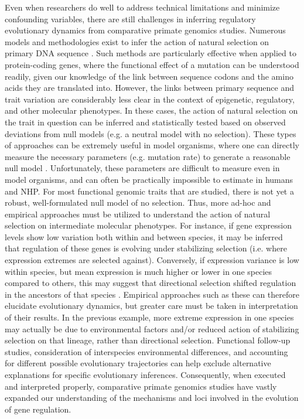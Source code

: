 Even when researchers do well to address technical limitations and minimize confounding variables, there are still challenges in inferring regulatory evolutionary dynamics from comparative primate genomics studies. Numerous models and methodologies exist to infer the action of natural selection on primary DNA sequence \cite{Vitti.2013}. Such methods are particularly effective when applied to protein-coding genes, where the functional effect of a mutation can be understood readily, given our knowledge of the link between sequence codons and the amino acids they are translated into. However, the links between primary sequence and trait variation are considerably less clear in the context of epigenetic, regulatory, and other molecular phenotypes. In these cases, the action of natural selection on the trait in question can be inferred and statistically tested based on observed deviations from null models (e.g. a neutral model with no selection). These types of approaches can be extremely useful in model organisms, where one can directly measure the necessary parameters (e.g. mutation rate) to generate a reasonable null model \cite{Gilad.2006a}. Unfortunately, these parameters are difficult to measure even in model organisms, and can often be practically impossible to estimate in humans and NHP. For most functional genomic traits that are studied, there is not yet a robust, well-formulated null model of no selection. Thus, more ad-hoc and empirical approaches must be utilized to understand the action of natural selection on intermediate molecular phenotypes. For instance, if gene expression levels show low variation both within and between species, it may be inferred that regulation of these genes is evolving under stabilizing selection (i.e. where expression extremes are selected against). Conversely, if expression variance is low within species, but mean expression is much higher or lower in one species compared to others, this may suggest that directional selection shifted regulation in the ancestors of that species \cite{Romero.2012}. Empirical approaches such as these can therefore elucidate evolutionary dynamics, but greater care must be taken in interpretation of their results. In the previous example, more extreme expression in one species may actually be due to environmental factors and/or reduced action of stabilizing selection on that lineage, rather than directional selection. Functional follow-up studies, consideration of interspecies environmental differences, and accounting for different possible evolutionary trajectories can help exclude alternative explanations for specific evolutionary inferences. Consequently, when executed and interpreted properly, comparative primate genomics studies have vastly expanded our understanding of the mechanisms and loci involved in the evolution of gene regulation.

